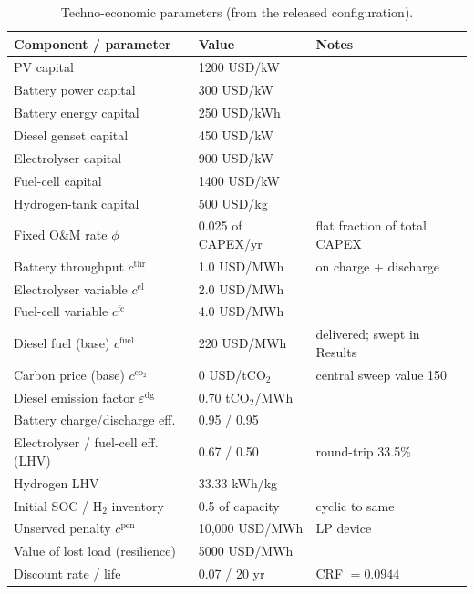 \documentclass[preprint,12pt]{elsarticle}
\begin{document}
\begin{table}[H]
\centering
\caption{Techno-economic parameters (from the released configuration).}
\label{tab:assumptions}
\small
\begin{tabularx}{\textwidth}{Xll}
\toprule
Component / parameter & Value & Notes \\
\midrule
PV capital & 1200 USD/kW & \\
Battery power capital & 300 USD/kW & \\
Battery energy capital & 250 USD/kWh & \\
Diesel genset capital & 450 USD/kW & \\
Electrolyser capital & 900 USD/kW & \\
Fuel-cell capital & 1400 USD/kW & \\
Hydrogen-tank capital & 500 USD/kg & \\
Fixed O\&M rate $\phi$ & 0.025 of CAPEX/yr & flat fraction of total CAPEX \\
Battery throughput $c^{\mathrm{thr}}$ & 1.0 USD/MWh & on charge + discharge \\
Electrolyser variable $c^{\mathrm{el}}$ & 2.0 USD/MWh & \\
Fuel-cell variable $c^{\mathrm{fc}}$ & 4.0 USD/MWh & \\
Diesel fuel (base) $c^{\mathrm{fuel}}$ & 220 USD/MWh & delivered; swept in Results \\
Carbon price (base) $c^{\mathrm{co_2}}$ & 0 USD/tCO$_2$ & central sweep value 150 \\
Diesel emission factor $\varepsilon^{\mathrm{dg}}$ & 0.70 tCO$_2$/MWh & \\
Battery charge/discharge eff. & 0.95 / 0.95 & \\
Electrolyser / fuel-cell eff. (LHV) & 0.67 / 0.50 & round-trip 33.5\% \\
Hydrogen LHV & 33.33 kWh/kg & \\
Initial SOC / H$_2$ inventory & 0.5 of capacity & cyclic to same \\
Unserved penalty $c^{\mathrm{pen}}$ & 10{,}000 USD/MWh & LP device \\
Value of lost load (resilience) & 5000 USD/MWh & \\
Discount rate / life & 0.07 / 20 yr & CRF $=0.0944$ \\
\bottomrule
\end{tabularx}
\end{table}

\end{document}
